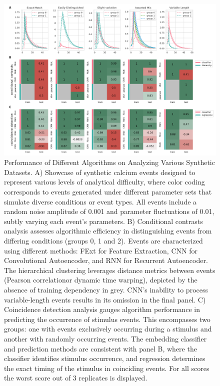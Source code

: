 \documentclass[utf8]{FrontiersinHarvard}
\begin{document}
    \begin{figure}[!htb]
        \begin{center}
            \includegraphics[width=\linewidth]{figures/6}
        \end{center}
        \caption{
            Performance of Different Algorithms on Analyzing Various Synthetic Datasets. A) Showcase of synthetic calcium events designed to represent various levels of analytical difficulty, where color coding corresponds to events generated under different parameter sets that simulate diverse conditions or event types. All events include a random noise amplitude of 0.001 and parameter fluctuations of 0.01, subtly varying each event's parameters. B) Conditional contrasts analysis assesses algorithmic efficiency in distinguishing events from differing conditions (groups 0, 1 and 2). Events are characterized using different methods: FExt for Feature Extraction, CNN for Convolutional Autoencoder, and RNN for Recurrent Autoencoder. The hierarchical clustering leverages distance metrics between events (Pearson correlationor dynamic time warping), depicted by the absence of training dependency in grey. CNN's inability to process variable-length events results in its omission in the final panel. C) Coincidence detection analysis gauges algorithm performance in predicting the occurrence of stimulus events. This encompasses two groups: one with events exclusively occurring during a stimulus and another with randomly occurring events. The embedding classifier and prediction methods are consistent with panel B, where the classifier identifies stimulus occurrence, and regression determines the exact timing of the stimulus in coinciding events. For all scores the worst score out of 3 replicates is displayed.
        }\label{fig:6}
    \end{figure}
\end{document}
